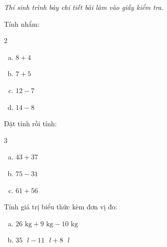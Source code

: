{\itshape Thí sinh trình bày chi tiết bài làm vào giấy kiểm tra.}

\begin{bt}[1,0 điểm]
Tính nhẩm:
\begin{multicols}{2}
\begin{enumerate}[a)]
  \item $8 + 4$
  \item $7 + 5$
  \item $12 - 7$
  \item $14 - 8$
\end{enumerate}
\end{multicols}
\end{bt}

\begin{bt}[1,5 điểm]
Đặt tính rồi tính:
\begin{multicols}{3}
\begin{enumerate}[a)]
  \item $43 + 37$
  \item $75 - 31$
  \item $61 + 56$
\end{enumerate}
\end{multicols}
\end{bt}

\begin{bt}[1,0 điểm]
Tính giá trị biểu thức kèm đơn vị đo:
\begin{enumerate}[a)]
  \item $26\text{ kg} + 9\text{ kg} - 10\text{ kg}$
  \item $35\text{ }l - 11\text{ }l + 8\text{ }l$
\end{enumerate}
\end{bt}

